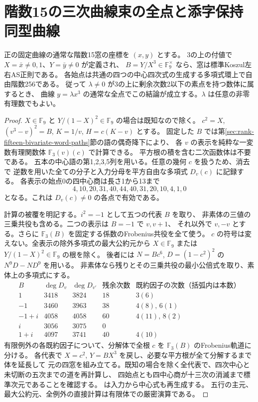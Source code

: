 \section{階数15の三次曲線束の全点と添字保持同型曲線}
\label{sec:rank-fifteen-cubic-pencils}
\begin{theorem}\label{thm:rank-fifteen-cubic-pencils}
正の固定曲線の通常な階数15窓の座標を $(x,y)$ とする。
3の上の付値で $X=\bar x\ne0,1$、$Y=\bar y\ne0$ が定義され、
$B=Y/X^3\in\mathbb F_9^\times$ なら、窓は標準Koszul左右AS正則である。
各始点は共通の四つの中心四次式の生成する多項式環上で自由階数256である。
従って $\lambda\ne0$ が3の上に剰余次数2以下の素点を持つ数体に属するとき、
曲線 $y=\lambda x^3$ の通常な全点でこの結論が成立する。$\lambda$ は任意の非零有理数でもよい。
\end{theorem}
\begin{proof}
$X\in\mathbb F_9$ と $Y/(1-X)^2\in\mathbb F_9$ の場合は既知なので除く。
$c^2=X$, $(v^3-v)^2=B$, $K=1/v$, $H=c(K-v)$ とする。
固定した $B$ では第\ref{sec:rank-fifteen-bivariate-word-paths}節の語の偶奇降下により、
各 $v$ の表示を純粋な一変数有理関数体 $\mathbb F_3(v)(c)$ で計算できる。
平方根の積を含む二次函数体は不要である。
五本の中心語の第1,2,3,5列を用いる。任意の幾何 $c$ を扱うため、消去で
逆数を用いた全ての分子と入力分母を平方自由な多項式 $D_v(c)$ に記録する。
各表示の始点0の四中心商は長さ1から13まで
\[
             4,10,20,31,40,44,40,31,20,10,4,1,0
\]
となる。これは $D_v(c)\ne0$ の各点で有効である。

計算の被覆を明記する。$i^2=-1$ として五つの代表 $B$ を取り、
非素体の三値の三乗共役も含める。二つの表示は $B=-1$ で $v,v+1$、
それ以外で $v,-v$ とする。さらに $\mathbb F_3(B)$ を固定する係数のFrobenius共役を全て使う。
$c$ の符号は変えない。全表示の除外多項式の最大公約元から
$X\in\mathbb F_9$ または $Y/(1-X)^2\in\mathbb F_9$ の根を除く。
後者には $N=Bc^6$, $D=(1-c^2)^2$ の $N^9D-ND^9$ を用いる。
非素体なら残りとその三乗共役の最小公倍式を取り、素体上の多項式にする。
\[
\begin{array}{c|rr|r|l}
 B &\deg D_v&\deg D_{v'}&\text{残余次数}&
   \text{既約因子の次数（括弧内は本数）}\\ \hline
 1&3418&3824&18&3(6)\\
 -1&3460&3963&38&4(8),\,6(1)\\
 -1+i&4058&4058&60&4(11),\,8(2)\\
 i&3056&3075&0&\\
 1+i&4097&3741&40&4(10)
\end{array}
\]
有限例外の各既約因子について、分解体で全根 $c$ を
$\mathbb F_3(B)$ のFrobenius軌道に分ける。
各代表で $X=c^2$, $Y=BX^3$ を戻し、必要な平方根が全て分解するまで体を延長して
元の四窓を組み立てる。既知の場合を除く全代表で、四次中心と未切断の五次までの道を再計算し、
四始点とも四中心商が十三次の消滅まで標準次元であることを確認する。
 は入力から中心式も再生成する。
五行の主元、最大公約元、全例外の直接計算は有限体での厳密演算である。


\end{proof}
